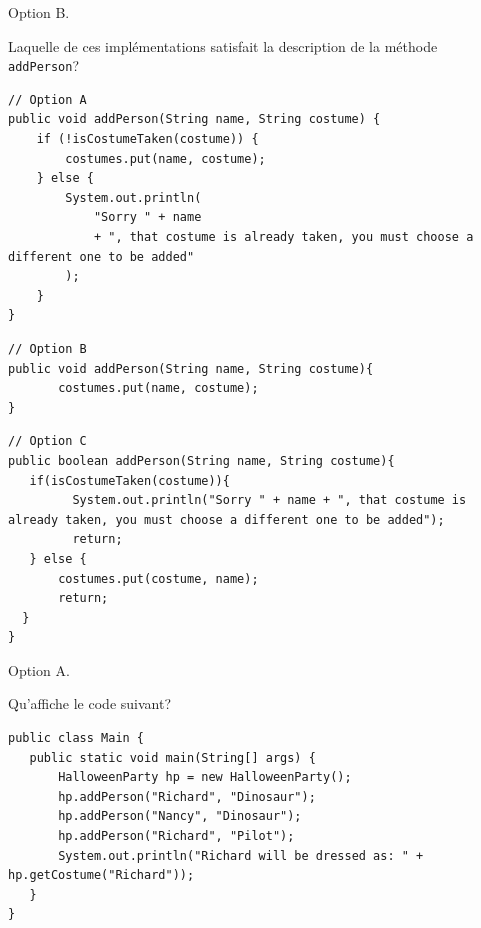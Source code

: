 \begin{Exercice}[5 minutes]

\begin{solution}
Option B. 
\end{solution} 

\vspace*{0.5cm}

Laquelle de ces implémentations satisfait la description de la méthode \texttt{addPerson}? \newline \newline 

\begin{lstlisting}[style=javastyle]
// Option A
public void addPerson(String name, String costume) {
    if (!isCostumeTaken(costume)) {
        costumes.put(name, costume);
    } else {
        System.out.println(
            "Sorry " + name
            + ", that costume is already taken, you must choose a different one to be added"
        );
    }
}
\end{lstlisting}

\begin{lstlisting}[style=javastyle]
// Option B
public void addPerson(String name, String costume){
       costumes.put(name, costume);
}
\end{lstlisting}

\begin{lstlisting}[style=javastyle]
// Option C
public boolean addPerson(String name, String costume){
   if(isCostumeTaken(costume)){
         System.out.println("Sorry " + name + ", that costume is already taken, you must choose a different one to be added");
         return;
   } else {
       costumes.put(costume, name);
       return;
  }
}
\end{lstlisting}

\begin{solution}
Option A.
\end{solution}

\vspace*{0.5cm}

Qu’affiche le code suivant? \newline 
\begin{lstlisting}[style=javastyle]
public class Main {
   public static void main(String[] args) {
       HalloweenParty hp = new HalloweenParty();
       hp.addPerson("Richard", "Dinosaur");
       hp.addPerson("Nancy", "Dinosaur");
       hp.addPerson("Richard", "Pilot");
       System.out.println("Richard will be dressed as: " + hp.getCostume("Richard"));
   }
}
\end{lstlisting}


\end{Exercice}
